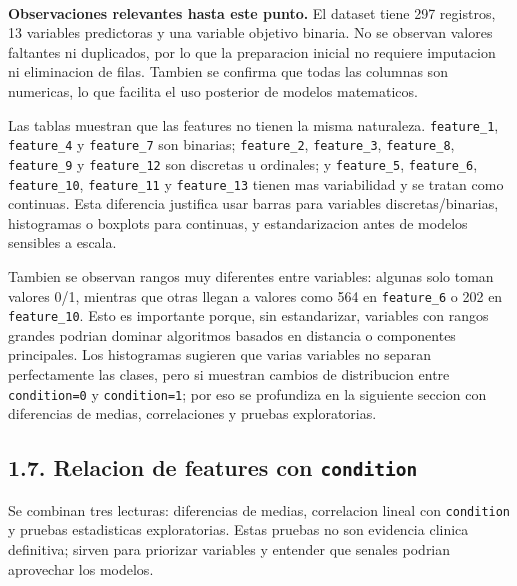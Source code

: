 \documentclass[11pt]{article}
\begin{document}
    \begin{center}
    \end{center}
    { \hspace*{\fill} \\}
    
    \textbf{Observaciones relevantes hasta este punto.} El dataset tiene 297
registros, 13 variables predictoras y una variable objetivo binaria. No
se observan valores faltantes ni duplicados, por lo que la preparacion
inicial no requiere imputacion ni eliminacion de filas. Tambien se
confirma que todas las columnas son numericas, lo que facilita el uso
posterior de modelos matematicos.

Las tablas muestran que las features no tienen la misma naturaleza.
\texttt{feature\_1}, \texttt{feature\_4} y \texttt{feature\_7} son
binarias; \texttt{feature\_2}, \texttt{feature\_3}, \texttt{feature\_8},
\texttt{feature\_9} y \texttt{feature\_12} son discretas u ordinales; y
\texttt{feature\_5}, \texttt{feature\_6}, \texttt{feature\_10},
\texttt{feature\_11} y \texttt{feature\_13} tienen mas variabilidad y se
tratan como continuas. Esta diferencia justifica usar barras para
variables discretas/binarias, histogramas o boxplots para continuas, y
estandarizacion antes de modelos sensibles a escala.

Tambien se observan rangos muy diferentes entre variables: algunas solo
toman valores 0/1, mientras que otras llegan a valores como 564 en
\texttt{feature\_6} o 202 en \texttt{feature\_10}. Esto es importante
porque, sin estandarizar, variables con rangos grandes podrian dominar
algoritmos basados en distancia o componentes principales. Los
histogramas sugieren que varias variables no separan perfectamente las
clases, pero si muestran cambios de distribucion entre
\texttt{condition=0} y \texttt{condition=1}; por eso se profundiza en la
siguiente seccion con diferencias de medias, correlaciones y pruebas
exploratorias.

    \subsection{\texorpdfstring{1.7. Relacion de features con
\texttt{condition}}{1.7. Relacion de features con condition}}\label{relacion-de-features-con-condition}

Se combinan tres lecturas: diferencias de medias, correlacion lineal con
\texttt{condition} y pruebas estadisticas exploratorias. Estas pruebas
no son evidencia clinica definitiva; sirven para priorizar variables y
entender que senales podrian aprovechar los modelos.
\end{document}
